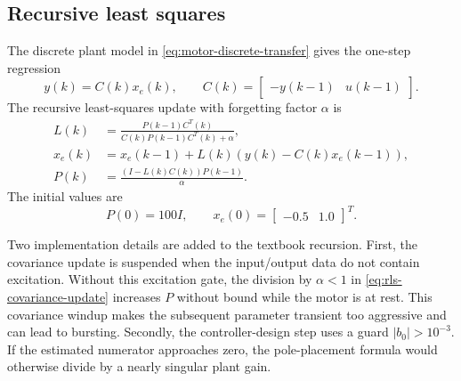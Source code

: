 \subsection{Recursive least squares}

The discrete plant model in \eqref{eq:motor-discrete-transfer} gives the
one-step regression
\begin{equation}
  y(k)=C(k)x_e(k),
  \qquad
  C(k)=\begin{bmatrix}-y(k-1) & u(k-1)\end{bmatrix}.
  \label{eq:rls-regression}
\end{equation}
The recursive least-squares update with forgetting factor \(\alpha\) is
\begin{align}
  L(k) &=
  \frac{P(k-1)C^{T}(k)}
       {C(k)P(k-1)C^{T}(k)+\alpha},
  \label{eq:rls-gain}\\
  x_e(k) &= x_e(k-1)+L(k)\left(y(k)-C(k)x_e(k-1)\right),
  \label{eq:rls-parameter-update}\\
  P(k) &= \frac{\left(I-L(k)C(k)\right)P(k-1)}{\alpha}.
  \label{eq:rls-covariance-update}
\end{align}
The initial values are
\begin{equation}
  P(0)=100I,
  \qquad
  x_e(0)=\begin{bmatrix}-0.5&1.0\end{bmatrix}^{T}.
  \label{eq:rls-initialisation}
\end{equation}

Two implementation details are added to the textbook recursion. First, the
covariance update is suspended when the input/output data do not contain
excitation. Without this excitation gate, the division by \(\alpha<1\) in
\eqref{eq:rls-covariance-update} increases \(P\) without bound while the motor
is at rest. This covariance windup makes the subsequent parameter transient
too aggressive and can lead to bursting. Secondly, the controller-design step
uses a guard \(|b_0|>10^{-3}\). If the estimated numerator approaches zero, the
pole-placement formula would otherwise divide by a nearly singular plant gain.
